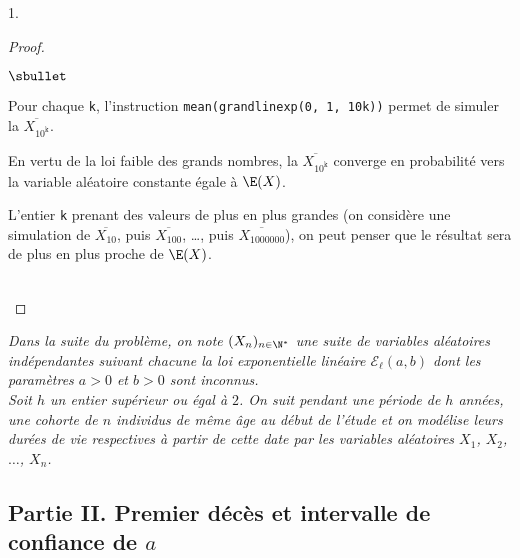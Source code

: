 \documentclass[11pt]{article}%
\begin{document}
\begin{noliste}{1.}
\begin{proof}
\begin{noliste}{$\sbullet$}
    \item Pour chaque {\tt k}, l'instruction {\tt mean(grandlinexp(0,
        1, 10\puis{}k))} permet de simuler la \var
      $\overline{X_{10^{\mathtt{k}}}}$.

    \item En vertu de la loi faible des grands nombres, la \var
      $\overline{X_{10^{\mathtt{k}}}}$ converge en probabilité vers la
      variable aléatoire constante égale à $\E(X)$.

    \item L'entier {\tt k} prenant des valeurs de plus en plus grandes 
      (on
      considère une simulation de $\overline{X_{10}}$, puis
      $\overline{X_{100}}$, \ldots, puis $\overline{X_{1000000}}$), on
      peut penser que le résultat sera de plus en plus proche de
      $\E(X)$.
    \end{noliste}
    ~\\[-1cm]
  \end{proof}
\end{noliste}


\newpage


\noindent%
{\it Dans la suite du problème, on note $(X_n)_{n\in\N^*}$ une suite
  de variables aléatoires indépendantes suivant chacune la loi
  exponentielle linéaire $\mathcal{E}_\ell(a,b)$ dont les paramètres
  $a>0$ et $b>0$ sont inconnus.\\
  Soit $h$ un entier supérieur ou égal à $2$. On suit pendant une
  période de $h$ années, une \og cohorte \fg{} de $n$ individus de
  même âge au début de l'étude et on modélise leurs durées de vie
  respectives à partir de cette date par les variables aléatoires
  $X_1$, $X_2$, $\hdots$, $X_n$.}


\subsection*{Partie II. Premier décès et intervalle de confiance de $a$}
\end{document}
